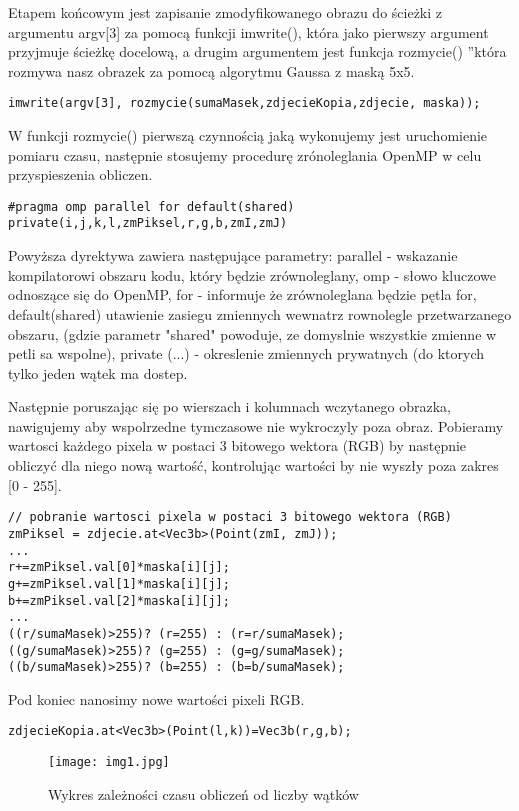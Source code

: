 \documentclass[a4paper,12pt]{article}
\begin{document}
Etapem końcowym jest zapisanie zmodyfikowanego obrazu do ścieżki z argumentu argv[3] za pomocą funkcji imwrite(), która jako pierwszy argument przyjmuje ścieżkę docelową, a drugim argumentem jest funkcja \quotedblbase rozmycie() \textquotedblright która rozmywa nasz obrazek za pomocą algorytmu Gaussa z maską 5x5.
\begin{lstlisting}
imwrite(argv[3], rozmycie(sumaMasek,zdjecieKopia,zdjecie, maska));
\end{lstlisting}
W funkcji rozmycie() pierwszą czynnością jaką wykonujemy jest uruchomienie pomiaru czasu, następnie stosujemy procedurę zrónoleglania OpenMP w celu przyspieszenia obliczen.
\begin{lstlisting}
#pragma omp parallel for default(shared) private(i,j,k,l,zmPiksel,r,g,b,zmI,zmJ)
\end{lstlisting}
Powyższa dyrektywa zawiera następujące parametry: parallel - wskazanie kompilatorowi obszaru kodu, który będzie zrównoleglany, omp - słowo kluczowe odnoszące się do OpenMP, for - informuje że zrównoleglana będzie pętla for, default(shared)  utawienie zasiegu zmiennych wewnatrz rownolegle przetwarzanego obszaru, 
(gdzie parametr "shared" powoduje, ze domyslnie wszystkie zmienne w petli sa wspolne), private (...) - okreslenie zmiennych prywatnych (do ktorych tylko jeden wątek ma dostep.

Następnie poruszając się po wierszach i kolumnach wczytanego obrazka, nawigujemy aby wspolrzedne tymczasowe nie wykroczyly poza obraz. Pobieramy wartosci każdego pixela w postaci 3 bitowego wektora (RGB)	by następnie obliczyć dla niego nową wartość, kontrolując wartości by nie wyszły poza zakres [0 - 255].


\begin{lstlisting}
// pobranie wartosci pixela w postaci 3 bitowego wektora (RGB)
zmPiksel = zdjecie.at<Vec3b>(Point(zmI, zmJ));					
...
r+=zmPiksel.val[0]*maska[i][j];
g+=zmPiksel.val[1]*maska[i][j];
b+=zmPiksel.val[2]*maska[i][j];
...
((r/sumaMasek)>255)? (r=255) : (r=r/sumaMasek);
((g/sumaMasek)>255)? (g=255) : (g=g/sumaMasek);
((b/sumaMasek)>255)? (b=255) : (b=b/sumaMasek);
\end{lstlisting}
 Pod koniec nanosimy nowe wartości pixeli RGB.
\begin{lstlisting}
zdjecieKopia.at<Vec3b>(Point(l,k))=Vec3b(r,g,b);		
\end{lstlisting}

\begin{wrapfigure}{r}{0.5\textwidth}
	\vspace{-40pt}
	\begin{center}
		\texttt{[image: img1.jpg]}
	\end{center}
	\vspace{-20pt}
	\caption{Wykres zależności czasu obliczeń od liczby wątków}
	\vspace{35pt}
\end{wrapfigure}
\end{document}
